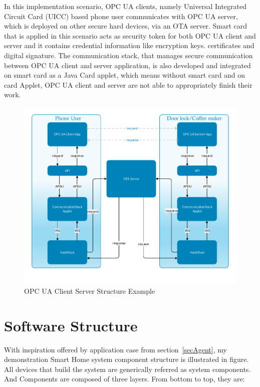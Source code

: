 In this implementation scenario, OPC UA clients, namely Universal Integrated Circuit Card (UICC)  based phone user communicates with OPC UA server, which is deployed on other secure hard devices, via an OTA server.   Smart card that is applied in this scenario acts as security token for both OPC UA client and server and it contains credential information like encryption keys. certificates and digital signature. The communication stack, that manages secure  communication between OPC UA client and server application, is also developed and integrated on smart card as a Java Card applet, which means without smart card and on card Applet, OPC UA client and server are not able to appropriately finish their work.


 \begin{figure}[ht]

	\centering
	\includegraphics[width=1.1\textwidth]{csoverview}
		\caption{OPC UA Client Server Structure Example}
	\label{fig:softwareStructure}
\end{figure}


\section {Software Structure}

With inspiration offered by application case from section~\ref{secAgent}, my demonstration Smart Home system component structure is illustrated in figure. All devices that build the system are generically referred as system components. And Components are composed of three layers. From bottom to top, they are:

